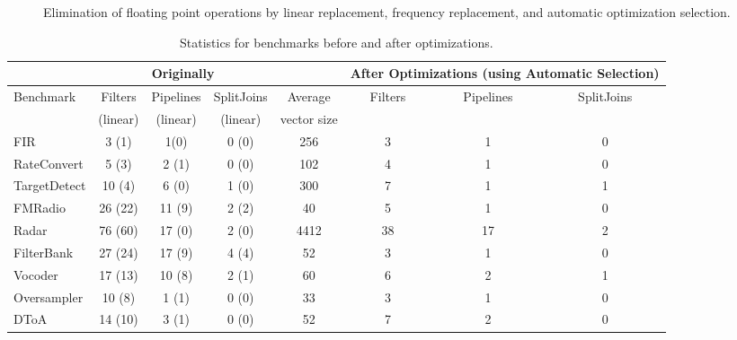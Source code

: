\begin{figure}[t]
\vspace{-16pt}
\vspace{-16pt}
\caption{Elimination of floating point operations by linear replacement, frequency replacement, and automatic optimization selection.}
\label{fig:flops}
\vspace{-12pt}
\makeline
\vspace{-12pt}
\end{figure}

\begin{table*}[t]
\vspace{-16pt}
\centering
\small
\begin{tabular}{|l|c|c|c||c||c|c|c|} 
\hline
& \multicolumn{3}{|c||}{Originally}  &             & \multicolumn{3}{|c|}{After Optimizations (using Automatic Selection)} \\
\hline
Benchmark  & Filters & Pipelines& SplitJoins & Average     & Filters      & Pipelines         & SplitJoins \\
           & (linear)& (linear) & (linear)   & vector size &              &                   &            \\
\hline
FIR        & 3 (1)   & 1(0)     & 0 (0)      & 256         & 3            & 1                 & 0 \\
\hline
RateConvert& 5 (3)   & 2 (1)    & 0 (0)      & 102         & 4            & 1                 & 0 \\
\hline
TargetDetect& 10 (4) & 6 (0)    & 1 (0)      & 300         & 7            & 1                 & 1 \\
\hline
FMRadio    & 26 (22) & 11 (9)   & 2 (2)      & 40          & 5            & 1                 & 0 \\
\hline
Radar      & 76 (60) & 17 (0)   & 2 (0)      & 4412        & 38           & 17                & 2 \\
\hline
FilterBank & 27 (24) & 17 (9)   & 4 (4)      & 52          & 3            & 1                 & 0 \\
\hline
Vocoder    & 17 (13) & 10 (8)   & 2 (1)      & 60          & 6            & 2                 & 1 \\
\hline
Oversampler& 10 (8) & 1 (1)     & 0 (0)      & 33          & 3            & 1                 & 0 \\
\hline
DToA       & 14 (10) & 3 (1)    & 0 (0)      & 52          & 7            & 2                 & 0 \\
\hline
\end{tabular}
\vspace{-3pt}
\caption{Statistics for benchmarks before and after optimizations.
\protect\label{fig:benchmark-statistics}}
\makeline
\vspace{-8pt}
\end{table*}

